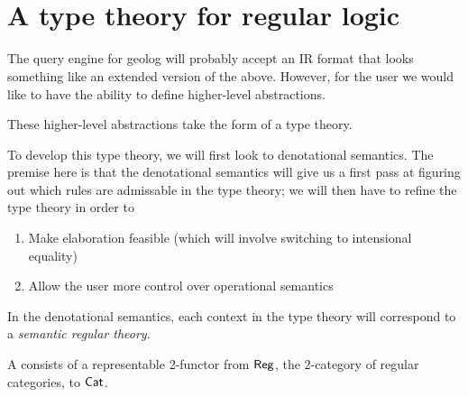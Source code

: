 \documentclass{acmart}
\begin{document}
\begin{code}
%
\>[2]\AgdaSpace{}%
\AgdaSpace{}%
\AgdaSymbol{=}\AgdaSpace{}%
\<%
\\
\>[2][@{}l@{\AgdaIndent{0}}]%
\>[4]\AgdaSymbol{(}\AgdaSpace{}%
\AgdaSymbol{)}\<%
\\
%
\>[4]\AgdaSpace{}%
\AgdaSpace{}%
\AgdaSymbol{->}\AgdaSpace{}%
\AgdaSpace{}%
\AgdaSymbol{(}\AgdaSpace{}%
\AgdaSymbol{(}\AgdaSpace{}%
\AgdaSymbol{)}\AgdaSpace{}%
\AgdaSpace{}%
\AgdaSpace{}%
\AgdaSpace{}%
\AgdaSymbol{(}\AgdaSpace{}%
\AgdaSymbol{)}\AgdaSpace{}%
\AgdaSymbol{))}\<%
\end{code}

\section{A type theory for regular logic}

The query engine for geolog will probably accept an IR format that looks something like an extended version of the above. However, for the user we would like to have the ability to define higher-level abstractions.

These higher-level abstractions take the form of a type theory.

To develop this type theory, we will first look to denotational semantics. The premise here is that the denotational semantics will give us a first pass at figuring out which rules are admissable in the type theory; we will then have to refine the type theory in order to

\begin{enumerate}
  \item Make elaboration feasible (which will involve switching to intensional equality)
  \item Allow the user more control over operational semantics
\end{enumerate}

In the denotational semantics, each context in the type theory will correspond to a \emph{semantic regular theory}.

\begin{definition}
  A  consists of a representable 2-functor from $\mathsf{Reg}$, the 2-category of regular categories, to $\mathsf{Cat}$.
\end{definition}
\end{document}
